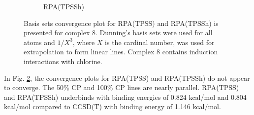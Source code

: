 \documentclass[11pt]{article}
\begin{document}
\begin{figure}[hbpt]
\begin{subfigure}{.5\textwidth}
    \caption{RPA(TPSSh)}
    \label{fig:tpssh_8}
  \end{subfigure}
  \caption{Basis sets convergence plot for RPA(TPSS) and RPA(TPSSh) is
    presented for complex 8. Dunning's basis sets were used for all atoms
    and $1/X^3$, where $X$ is the cardinal number, was used for extrapolation
    to form linear lines. Complex 8 contains induction interactions with
    chlorine.}
  \label{fig:complex_8}
\end{figure}

In Fig. \ref{fig:complex_8}, the convergence plots for RPA(TPSS)
and RPA(TPSSh) do not appear to converge. The 50$\%$ CP and 100$\%$ CP
lines are nearly parallel. RPA(TPSS) and RPA(TPSSh) underbinds with
binding energies of 0.824 kcal/mol and 0.804 kcal/mol compared to CCSD(T)
with binding energy of 1.146 kcal/mol.
\end{document}
